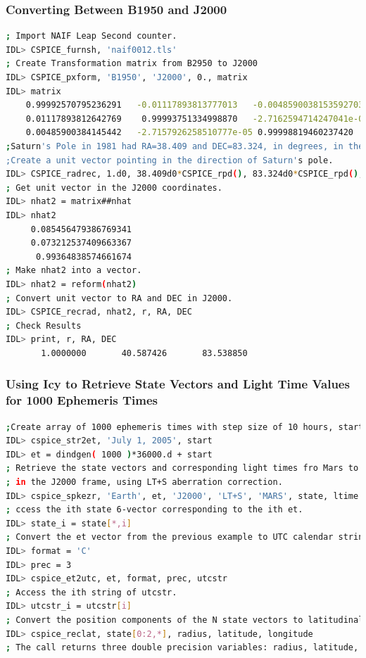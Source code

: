 \documentclass[crop=false,class=book]{standalone}
\begin{document}
\subsubsection{Converting Between B1950 and J2000}
\begin{lstlisting}[language=bash,basicstyle=\footnotesize]
; Import NAIF Leap Second counter.
IDL> CSPICE_furnsh, 'naif0012.tls'
; Create Transformation matrix from B2950 to J2000
IDL> CSPICE_pxform, 'B1950', 'J2000', 0., matrix
IDL> matrix
    0.99992570795236291   -0.01117893813777013   -0.0048590038153592703
    0.01117893812642769    0.99993751334998870   -2.7162594714247041e-05
    0.00485900384145442   -2.7157926258510777e-05 0.99998819460237420
;Saturn's Pole in 1981 had RA=38.409 and DEC=83.324, in degrees, in the B1950 system.
;Create a unit vector pointing in the direction of Saturn's pole.
IDL> CSPICE_radrec, 1.d0, 38.409d0*CSPICE_rpd(), 83.324d0*CSPICE_rpd(), nhat 
; Get unit vector in the J2000 coordinates.
IDL> nhat2 = matrix##nhat                                                    
IDL> nhat2
     0.085456479386769341
     0.073212537409663367
      0.99364838574661674
; Make nhat2 into a vector.
IDL> nhat2 = reform(nhat2)
; Convert unit vector to RA and DEC in J2000.
IDL> CSPICE_recrad, nhat2, r, RA, DEC
; Check Results
IDL> print, r, RA, DEC
       1.0000000       40.587426       83.538850
\end{lstlisting}
\subsubsection{Using Icy to Retrieve State Vectors and Light Time Values for 1000 Ephemeris Times}
\begin{lstlisting}[language=bash,basicstyle=\footnotesize]
;Create array of 1000 ephemeris times with step size of 10 hours, starting July 1, 2005.
IDL> cspice_str2et, 'July 1, 2005', start
IDL> et = dindgen( 1000 )*36000.d + start
; Retrieve the state vectors and corresponding light times fro Mars to Earth at each et,
; in the J2000 frame, using LT+S aberration correction.
IDL> cspice_spkezr, 'Earth', et, 'J2000', 'LT+S', 'MARS', state, ltime
; ccess the ith state 6-vector corresponding to the ith et.
IDL> state_i = state[*,i]
; Convert the et vector from the previous example to UTC calendar strings.
IDL> format = 'C'
IDL> prec = 3
IDL> cspice_et2utc, et, format, prec, utcstr
; Access the ith string of utcstr.
IDL> utcstr_i = utcstr[i]
; Convert the position components of the N state vectors to latitudinal coordinates.
IDL> cspice_reclat, state[0:2,*], radius, latitude, longitude
; The call returns three double precision variables: radius, latitude, longitude.
\end{lstlisting}
\end{document}
